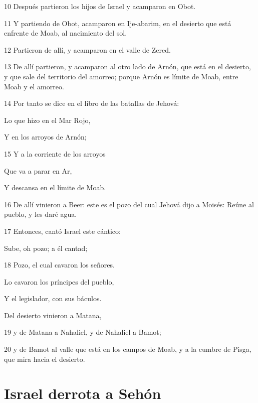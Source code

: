 \par 10 Después partieron los hijos de Israel y acamparon en Obot.
\par 11 Y partiendo de Obot, acamparon en Ije-abarim, en el desierto que está enfrente de Moab, al nacimiento del sol.
\par 12 Partieron de allí, y acamparon en el valle de Zered.
\par 13 De allí partieron, y acamparon al otro lado de Arnón, que está en el desierto, y que sale del territorio del amorreo; porque Arnón es límite de Moab, entre Moab y el amorreo.
\par 14 Por tanto se dice en el libro de las batallas de Jehová:
\par Lo que hizo en el Mar Rojo,
\par Y en los arroyos de Arnón;
\par 15 Y a la corriente de los arroyos
\par Que va a parar en Ar,
\par Y descansa en el límite de Moab. 
\par 16 De allí vinieron a Beer: este es el pozo del cual Jehová dijo a Moisés: Reúne al pueblo, y les daré agua.
\par 17 Entonces, cantó Israel este cántico:
\par Sube, oh pozo; a él cantad; 
\par 18 Pozo, el cual cavaron los señores.
\par Lo cavaron los príncipes del pueblo,
\par Y el legislador, con sus báculos.
\par Del desierto vinieron a Matana, 
\par 19 y de Matana a Nahaliel, y de Nahaliel a Bamot;
\par 20 y de Bamot al valle que está en los campos de Moab, y a la cumbre de Pisga, que mira hacia el desierto.

\section*{Israel derrota a Sehón }

